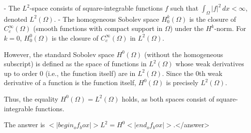 - The \( L^2 \)-space consists of square-integrable functions \( f \) such that \( \int_\Omega |f|^2 \, dx < \infty \), denoted \( L^2(\Omega) \).  
- The homogeneous Sobolev space \( H^k_0(\Omega) \) is the closure of \( C_c^\infty(\Omega) \) (smooth functions with compact support in \( \Omega \)) under the \( H^k \)-norm. For \( k = 0 \), \( H^0_0(\Omega) \) is the closure of \( C_c^\infty(\Omega) \) in \( L^2(\Omega) \).  

However, the standard Sobolev space \( H^0(\Omega) \) (without the homogeneous subscript) is defined as the space of functions in \( L^2(\Omega) \) whose weak derivatives up to order 0 (i.e., the function itself) are in \( L^2(\Omega) \). Since the 0th weak derivative of a function is the function itself, \( H^0(\Omega) \) is precisely \( L^2(\Omega) \).  

Thus, the equality \( H^0(\Omega) = L^2(\Omega) \) holds, as both spaces consist of square-integrable functions.  

The answer is \(<|begin_of_box|>L^2 = H^0<|end_of_box|>\).</answer>